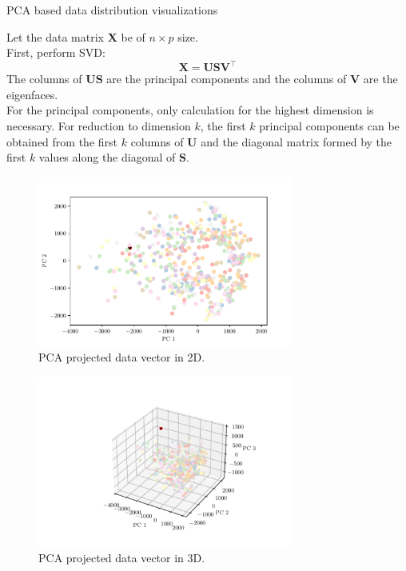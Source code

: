 \documentclass[a4paper,12pt]{exam}
\begin{document}
\begin{questions}
    \question PCA based data distribution visualizations

    Let the data matrix $\mathbf{X}$ be of $n \times p$ size.\\
    First, perform SVD:
    \begin{equation}
        \mathbf{X}=\mathbf{USV^\intercal}
    \end{equation}
    The columns of $\mathbf{US}$ are the principal components and the columns of $\mathbf{V}$ are the eigenfaces.\\
    For the principal components, only calculation for the highest dimension is necessary. For reduction to
    dimension $k$, the first $k$ principal components can be obtained from the first $k$ columns of
    $\mathbf{U}$ and the diagonal matrix formed by the first $k$ values along the diagonal of $\mathbf{S}$.

    \begin{figure}[h]
        \centering
        \includegraphics[width=0.75\textwidth]{pca_2d}
        \caption{PCA projected data vector in 2D.}
        \label{fig:pca_2d}
    \end{figure}

    \begin{figure}[ht]
        \centering
        \includegraphics[width=0.75\textwidth]{pca_3d}
        \caption{PCA projected data vector in 3D.}
        \label{fig:pca_3d}
    \end{figure}


\end{questions}
\end{document}
